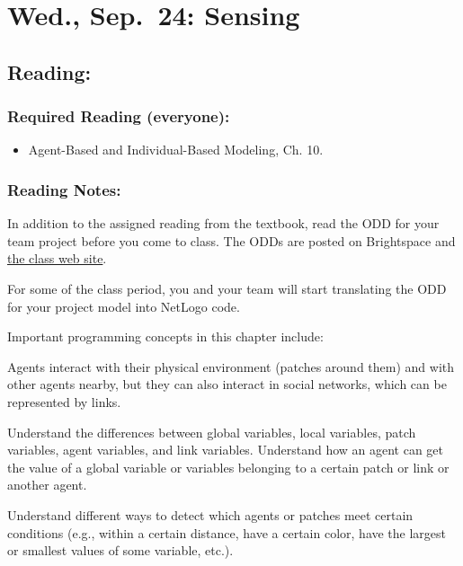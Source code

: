 \documentclass[
]{article}
\providecommand{\tightlist}{%
  \setlength{\itemsep}{0pt}\setlength{\parskip}{0pt}}
\begin{document}
\section{Wed., Sep.~24: Sensing}\label{wed.-sep.-24-sensing}

\subsection{Reading:}\label{reading-10}

\subsubsection{Required Reading
(everyone):}\label{required-reading-everyone-9}

\begin{itemize}
\tightlist
\item
  Agent-Based and Individual-Based Modeling, Ch. 10.
\end{itemize}

\subsubsection{Reading Notes:}\label{reading-notes-9}

In addition to the assigned reading from the textbook, read the ODD for
your team project before you come to class. The ODDs are posted on
Brightspace and \href{/projects/}{the class web site}.

For some of the class period, you and your team will start translating
the ODD for your project model into NetLogo code.

Important programming concepts in this chapter include:

\begin{description}
\tightlist
\item[Links:]
Agents interact with their physical environment (patches around them)
and with other agents nearby, but they can also interact in social
networks, which can be represented by links.
\item[Variable scope:]
Understand the differences between global variables, local variables,
patch variables, agent variables, and link variables. Understand how an
agent can get the value of a global variable or variables belonging to a
certain patch or link or another agent.
\item[Entity detection:]
Understand different ways to detect which agents or patches meet certain
conditions (e.g., within a certain distance, have a certain color, have
the largest or smallest values of some variable, etc.).
\end{description}
\end{document}
